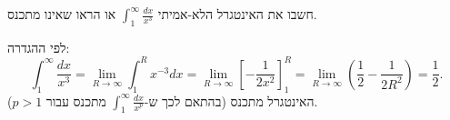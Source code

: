 
\begin{question}
חשבו את האינטגרל הלא-אמיתי $\displaystyle\int_1^\infty\frac{dx}{x^3}$ או הראו שאינו מתכנס.
\end{question}

\begin{solution}
לפי ההגדרה:
\[ \int_1^\infty\frac{dx}{x^3}=\lim_{R\to\infty}\int_1^R x^{-3}dx=\lim_{R\to\infty}\left[-\frac{1}{2x^2}\right]_1^R=\lim_{R\to\infty}\left(\frac12-\frac{1}{2R^2}\right)=\boxed{\frac12}. \]
האינטגרל מתכנס (בהתאם לכך ש-$\int_1^\infty\frac{dx}{x^p}$ מתכנס עבור $p>1$).
\end{solution}

